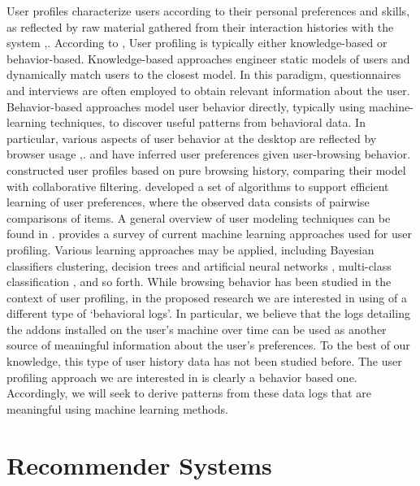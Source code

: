 \documentclass[11pt,oneside]{book}
\let\Oldsection\section
\renewcommand{\section}{\FloatBarrier\Oldsection}
\begin{document}
User profiles characterize users according to their personal
preferences and skills, as reflected by raw material gathered from
their interaction histories with the system \citep{koch2001software},\citep{gauch2007user}. According to \citep{gauch2007user}, User profiling is typically either knowledge-based or
behavior-based. Knowledge-based approaches engineer static models of
users and dynamically match users to the closest model. In this
paradigm, questionnaires and interviews are often employed to obtain
relevant information about the user. Behavior-based approaches model
user behavior directly, typically using machine-learning techniques,
to discover useful patterns from behavioral data. In particular,
various aspects of user behavior at the desktop are reflected by
browser usage \citep{benevenuto2009characterizing},\citep{bilenko11}. \citep{lieberman1995letizia} and \citep{joachims97} have inferred user preferences given user-browsing behavior. \citep{sugiyama2004adaptive} constructed user profiles based on pure browsing history,
comparing their model with collaborative filtering.  \citep{lu2011learning} developed a set of algorithms to support efficient
learning of user preferences, where the observed data consists of
pairwise comparisons of items.  A general overview of user modeling
techniques can be found in \citep{leontiadis2012don}. \citep{sebastiani02} provides a survey of current machine learning
approaches used for user profiling.  Various learning approaches may
be applied, including Bayesian classifiers clustering, decision trees
and artificial neural networks \citep{pazzani97}, multi-class classification \cite{bauer2014analyzing},
and so forth.  While browsing behavior has been studied in the context
of user profiling, in the proposed research we are interested in using
of a different type of `behavioral logs'. In particular, we believe
that the logs detailing the addons installed on the user's machine
over time can be used as another source of meaningful information
about the user's preferences. To the best of our knowledge, this type
of user history data has not been studied before. The user profiling
approach we are interested in is clearly a behavior based
one. Accordingly, we will seek to derive patterns from these data logs
that are meaningful using machine learning methods.

\section{Recommender Systems}
\label{sec:recommender_systems}
\end{document}
